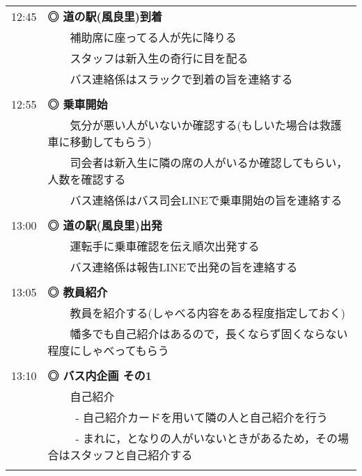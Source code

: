 \begin{longtable}{p{}p{}}
 12:45 & \textbf{◎ 道の駅(風良里)到着} \\
	& \ \  \textbullet \ \ 補助席に座ってる人が先に降りる\\
	& \ \  \textbullet \ \ スタッフは新入生の奇行に目を配る\\
	& \ \  \textbullet \ \ バス連絡係はスラックで到着の旨を連絡する \\\\

12:55 & \textbf{◎ 乗車開始} \\
	& \ \  \textbullet \ \ 気分が悪い人がいないか確認する(もしいた場合は救護車に移動してもらう)\\
	& \ \  \textbullet \ \ 司会者は新入生に隣の席の人がいるか確認してもらい，人数を確認する\\
	& \ \  \textbullet \ \ バス連絡係はバス司会LINEで乗車開始の旨を連絡する\\\\

13:00 & \textbf{◎ 道の駅(風良里)出発} \\
	& \ \  \textbullet \ \ 運転手に乗車確認を伝え順次出発する\\
	& \ \  \textbullet \ \ バス連絡係は報告LINEで出発の旨を連絡する\\\\

13:05  & \textbf{◎ 教員紹介} \\ 
	& \ \ \textbullet \ \ 教員を紹介する(しゃべる内容をある程度指定しておく)\\
	& \ \ \textbullet \ \ 幡多でも自己紹介はあるので，長くならず固くならない程度にしゃべってもらう  \\\\
	
13:10 & \textbf{◎ バス内企画 その1} \\
      	& \ \  \textbullet \ \ 自己紹介\\
        & \ \ \ \ \  - 自己紹介カードを用いて隣の人と自己紹介を行う\\
        & \ \ \ \ \  - まれに，となりの人がいないときがあるため，その場合はスタッフと自己紹介する\\\\


\end{longtable}
